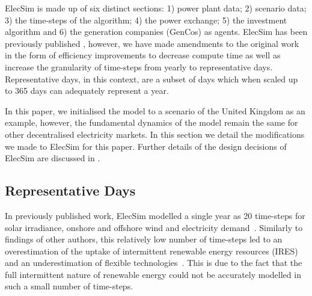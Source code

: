 ElecSim is made up of six distinct sections: 1) power plant data; 2) scenario data; 3) the time-steps of the algorithm; 4) the power exchange; 5) the investment algorithm and 6) the generation companies (GenCos) as agents. ElecSim has been previously published \cite{Kell}, however, we have made amendments to the original work in the form of  efficiency improvements to decrease compute time as well as increase the granularity of time-steps from yearly to representative days.  Representative days, in this context, are a subset of days which when scaled up to 365 days can adequately represent a year. 

In this paper, we initialised the model to a scenario of the United Kingdom as an example, however, the fundamental dynamics of the model remain the same for other decentralised electricity markets. In this section we detail the modifications we made to ElecSim for this paper. Further details of the design decisions of ElecSim are discussed in \cite{Kell}.


\subsection{Representative Days}
\label{ssec:representative_days}

In previously published work, ElecSim modelled a single year as 20 time-steps for solar irradiance, onshore and offshore wind and electricity demand~\cite{Kell}. Similarly to findings of other authors, this relatively low number of time-steps led to an overestimation of the uptake of intermittent renewable energy resources (IRES) and an underestimation of flexible technologies~\cite{Ludig2011,Haydt2011}. This is due to the fact that the full intermittent nature of renewable energy could not be accurately modelled in such a small number of time-steps.



